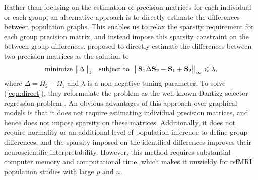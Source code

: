 \documentclass[useAMS,usenatbib,referee]{bio}
\begin{document}
Rather than focusing on the estimation of precision matrices for each individual or each group, an alternative approach is to directly estimate the differences between population graphs. This enables us to relax the sparsity requirement for each group precision matrix, and instead impose this sparsity constraint on the between-group differences.  \citet{Zhao:2014} proposed to directly estimate the differences between two precision matrices as the solution to
\begin{equation} \label{eqn:direct} 
\mbox{minimize }  \big\| \Delta\big\|_1 \quad 
\mbox{subject to} ~~ \big\| {\bf S}_1 \Delta {\bf S}_2 -  {\bf S}_1 + {\bf S}_2 \big\|_{\infty} \le \lambda,
\end{equation} 
where $\Delta = \Omega_2-\Omega_1$ and $\lambda$ is a non-negative tuning parameter. To solve (\ref{eqn:direct}), they reformulate the problem as the well-known Dantizg selector regression problem \citep{Candes:2005}. An obvious advantages of this approach over graphical models is that it does not require estimating individual precision matrices, and hence does not impose sparsity on these matrices. Additionally, it does not require normality or an additional level of population-inference to define group differences, and the sparsity imposed on the identified differences improves their neuroscientific interpretability. However, this method requires substantial computer memory and computational time, which makes it unwieldy for rsfMRI population studies with large $p$ and $n$.
\end{document}
